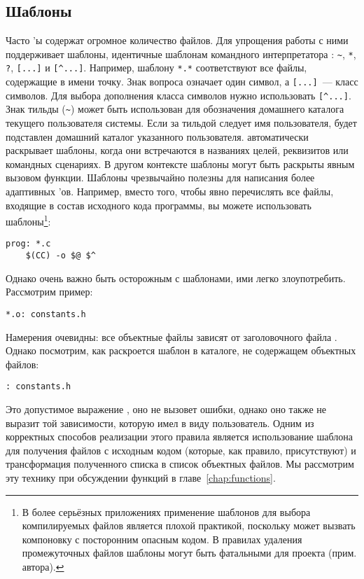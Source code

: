 \subsection{Шаблоны}
Часто \Makefile'ы содержат огромное количество файлов. Для упрощения
работы с ними \GNUmake{} поддерживает шаблоны, идентичные шаблонам
командного интерпретатора : \verb|~|, \verb|*|,
\verb|?|, \verb|[...]| и \verb|[^...]|.  Например, шаблону \verb|*.*|
соответствуют все файлы, содержащие в имени точку. Знак вопроса
означает один символ, а \verb|[...]|~--- класс символов. Для выбора
дополнения класса символов нужно использовать \verb|[^...]|. Знак
тильды (\verb|~|) может быть использован для обозначения домашнего
каталога текущего пользователя системы.  Если за тильдой следует имя
пользователя, будет подставлен домашний каталог указанного
пользователя. \GNUmake{} автоматически раскрывает шаблоны, когда они
встречаются в названиях целей, реквизитов или командных сценариях. В
другом контексте шаблоны могут быть раскрыты явным вызовом функции.
Шаблоны чрезвычайно полезны для написания более адаптивных
\Makefile{}'ов. Например, вместо того, чтобы явно перечислять все
файлы, входящие в состав исходного кода программы, вы можете
использовать шаблоны\footnote{В более серьёзных приложениях применение
шаблонов для выбора компилируемых файлов является плохой практикой,
поскольку может вызвать компоновку с посторонним опасным кодом. В
правилах удаления промежуточных файлов шаблоны могут быть фатальными
для проекта (прим. автора).}:

{\footnotesize
\begin{verbatim}
prog: *.c
	$(CC) -o $@ $^
\end{verbatim}
}

Однако очень важно быть осторожным с шаблонами, ими легко
злоупотребить. Рассмотрим пример:

{\footnotesize
\begin{verbatim}
*.o: constants.h
\end{verbatim}
}

Намерения очевидны: все объектные файлы зависят от заголовочного файла
. Однако посмотрим, как раскроется шаблон в
каталоге, не содержащем объектных файлов:

{\footnotesize
\begin{verbatim}
: constants.h
\end{verbatim}
}

Это допустимое выражение \GNUmake{}, оно не вызовет ошибки, однако оно
также не выразит той зависимости, которую имел в виду пользователь.
Одним из корректных способов реализации этого правила является
использование шаблона для получения файлов с исходным кодом (которые,
как правило, присутствуют) и трансформация полученного списка в список
объектных файлов. Мы рассмотрим эту технику при обсуждении функций
в главе~{\ref{chap:functions}}.

